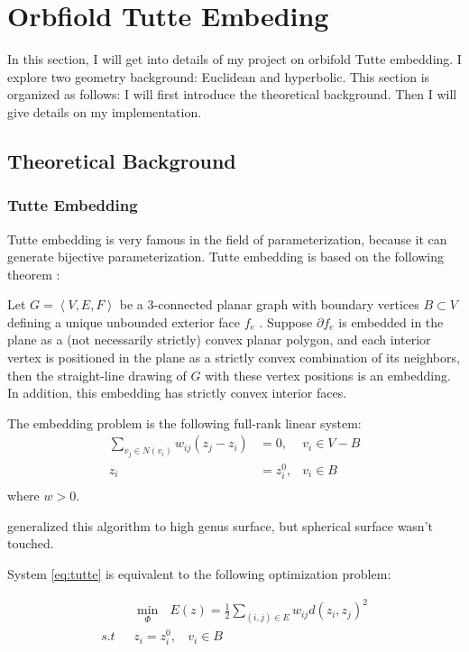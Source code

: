 

\section{Orbfiold Tutte Embeding}
In this section, I will get into details of my project on orbifold Tutte embedding. I explore two geometry background: Euclidean and hyperbolic. This section is organized as follows: I will first introduce the theoretical background. Then I will give details on my implementation.

\subsection{Theoretical Background}
\subsubsection{Tutte Embedding}
Tutte embedding is very famous in the field of parameterization, because it can generate bijective parameterization. Tutte embedding is based on the following theorem \cite{Tutte1963graph}:
\begin{theorem}\label{tutte-theorem}
Let $G = \left<V , E , F \right>$ be a 3-connected planar graph with boundary vertices $B \subset V$ defining a unique unbounded exterior face $f_e$ . Suppose $\partial f_e$ is embedded in the plane as a (not necessarily strictly) convex planar polygon, and each interior vertex is positioned in the plane as a strictly convex combination of its neighbors, then the straight-line drawing of $G$ with these vertex positions is an embedding. In addition, this embedding has strictly convex interior faces.
\end{theorem}
The embedding problem is the following full-rank linear system:
\begin{equation}
\begin{split}
\sum_{v_j \in \mathit{N}(v_i)} w_{ij}(z_j-z_i) &= 0,  &v_i \in V - B\\
z_i &= z_i^0, &v_i \in B\\
\end{split}
\label{eq:tutte}
\end{equation}
where $w > 0$.

\cite{Gortler:2006:DOM:1133946.1648437} generalized this algorithm to high genus surface, but spherical surface wasn't touched.

System \ref{eq:tutte} is equivalent to the following optimization problem:

\begin{equation}
\begin{split}
&\min_{\Phi}\ \ \   E(z) = \frac{1}{2}\sum_{(i,j)\in E} w_{ij} d(z_i, z_j)^2 \\
s.t \ \ \   &z_i = z_i^0, \ \ \ \ v_i \in B
\end{split}
\end{equation}


